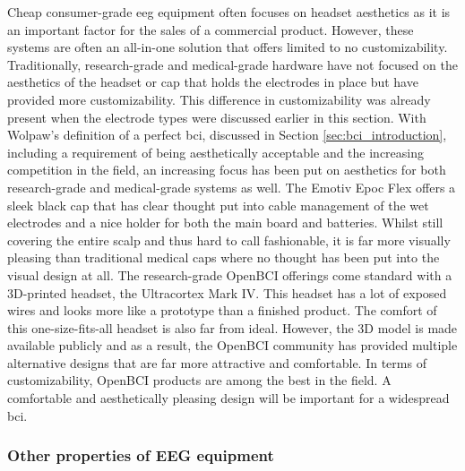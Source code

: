 Cheap consumer-grade \gls{eeg} equipment often focuses on headset aesthetics as it is an important factor for the sales of a commercial product. 
However, these systems are often an all-in-one solution that offers limited to no customizability.
Traditionally, research-grade and medical-grade hardware have not focused on the aesthetics of the headset or cap that holds the electrodes in place but have provided more customizability.
This difference in customizability was already present when the electrode types were discussed earlier in this section.
With Wolpaw's definition of a perfect \gls{bci}, discussed in Section \ref{sec:bci_introduction}, including a requirement of being aesthetically acceptable and the increasing competition in the field, an increasing focus has been put on aesthetics for both research-grade and medical-grade systems as well.
The Emotiv Epoc Flex offers a sleek black cap that has clear thought put into cable management of the wet electrodes and a nice holder for both the main board and batteries.
Whilst still covering the entire scalp and thus hard to call fashionable, it is far more visually pleasing than traditional medical caps where no thought has been put into the visual design at all.
The research-grade OpenBCI offerings come standard with a 3D-printed headset, the Ultracortex Mark IV.
This headset has a lot of exposed wires and looks more like a prototype than a finished product.
The comfort of this one-size-fits-all headset is also far from ideal.
However, the 3D model is made available publicly and as a result, the OpenBCI community has provided multiple alternative designs that are far more attractive and comfortable.
In terms of customizability, OpenBCI products are among the best in the field.
A comfortable and aesthetically pleasing design will be important for a widespread \gls{bci}.




\subsubsection{Other properties of EEG equipment}
\label{subsubsec:biomedical_signals_measuring_brain_equipment_others}


